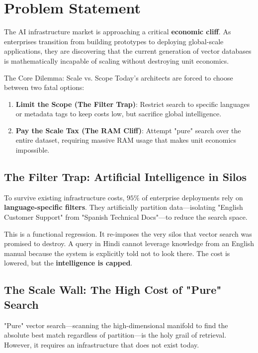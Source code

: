 \section{Problem Statement}

The AI infrastructure market is approaching a critical \textbf{economic cliff}. As enterprises transition from building prototypes to deploying global-scale applications, they are discovering that the current generation of vector databases is mathematically incapable of scaling without destroying unit economics.

\begin{cosmabox}[cosmaOrange]{The Core Dilemma: Scale vs. Scope}
Today's architects are forced to choose between two fatal options:
\begin{enumerate}
    \item \textbf{Limit the Scope (The Filter Trap)}: Restrict search to specific languages or metadata tags to keep costs low, but sacrifice global intelligence.
    \item \textbf{Pay the Scale Tax (The RAM Cliff)}: Attempt "pure" search over the entire dataset, requiring massive RAM usage that makes unit economics impossible.
\end{enumerate}
\end{cosmabox}

\subsection{The Filter Trap: Artificial Intelligence in Silos}
To survive existing infrastructure costs, $95\%$ of enterprise deployments rely on \textbf{language-specific filters}. They artificially partition data—isolating "English Customer Support" from "Spanish Technical Docs"—to reduce the search space.

This is a functional regression. It re-imposes the very silos that vector search was promised to destroy. A query in Hindi cannot leverage knowledge from an English manual because the system is explicitly told not to look there. The cost is lowered, but the \textbf{intelligence is capped}.

\subsection{The Scale Wall: The High Cost of "Pure" Search}
"Pure" vector search—scanning the high-dimensional manifold to find the absolute best match regardless of partition—is the holy grail of retrieval. However, it requires an infrastructure that does not exist today.


